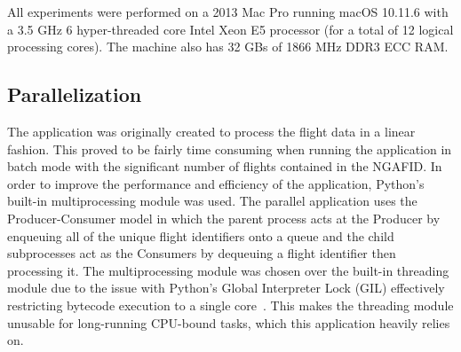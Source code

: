 	All experiments were performed on a 2013 Mac Pro running macOS 10.11.6 with a 3.5 GHz 6 hyper-threaded core Intel Xeon E5 processor (for a total of 12 logical processing cores). The machine also has 32 GBs of 1866 MHz DDR3 ECC RAM.


\subsection{Parallelization} \label{sec:parallelization}

	The application was originally created to process the flight data in a linear fashion.  This proved to be fairly time consuming when running the application in batch mode with the significant number of flights contained in the NGAFID.  In order to improve the performance and efficiency of the application, Python's built-in multiprocessing module was used.  The parallel application uses the Producer-Consumer model in which the parent process acts at the Producer by enqueuing all of the unique flight identifiers onto a queue and the child subprocesses act as the Consumers by dequeuing a flight identifier then processing it.  The multiprocessing module was chosen over the built-in threading module due to the issue with Python's Global Interpreter Lock (GIL) effectively restricting bytecode execution to a single core~\cite{beazley2010understanding}.  This makes the threading module unusable for long-running CPU-bound tasks, which this application heavily relies on.
	